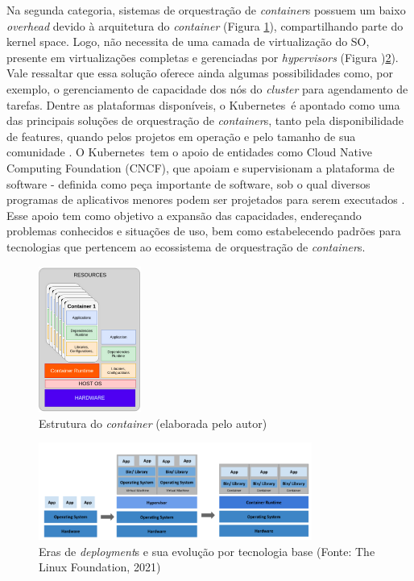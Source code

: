 Na segunda categoria, sistemas de orquestração de \emph{container}s possuem um baixo \emph{overhead} devido à arquitetura do \emph{container} (Figura \ref{fig:container}), compartilhando parte do kernel space. Logo, não necessita de uma camada de virtualização do SO, presente em virtualizações completas e gerenciadas por \emph{hypervisors} (Figura )\ref{fig:vmscontainer}). Vale ressaltar que essa solução oferece ainda algumas possibilidades como, por exemplo,  o gerenciamento de capacidade dos nós do \emph{cluster} para agendamento de tarefas. Dentre as plataformas disponíveis, o Kubernetes\textregistered \ é apontado como uma das principais soluções de orquestração de \emph{container}s, tanto pela disponibilidade de features, quando pelos projetos em operação e pelo tamanho de sua comunidade \cite{truyen_comprehensive_2021}. O Kubernetes\textregistered \ tem o apoio de entidades como Cloud Native Computing Foundation (CNCF), que apoiam e supervisionam a plataforma de software -  definida como peça importante de software, sob o qual diversos programas de aplicativos menores podem ser projetados para serem executados \cite{collins2022}. Esse apoio tem como objetivo a expansão  das capacidades, endereçando problemas conhecidos e situações de uso, bem como estabelecendo padrões para tecnologias que pertencem ao ecossistema de orquestração de \emph{container}s.

\begin{figure}[!h]
    \centering
    \includegraphics[width=0.3\textwidth]{04-figuras/containers.png}
    \caption[Estrutura do \emph{container} ]{Estrutura do \emph{container} (elaborada pelo autor)}
    \label{fig:container}
\end{figure}

\begin{figure}[!h]
    \centering
    \includegraphics[width=0.8\textwidth]{04-figuras/vmsContainer.png}
    \caption[Eras de \emph{deployment}s e sua evolução por tecnologia base ]{Eras de \emph{deployment}s e sua evolução por tecnologia base (Fonte: The Linux Foundation\textregistered, 2021)}
    \label{fig:vmscontainer}
\end{figure}

